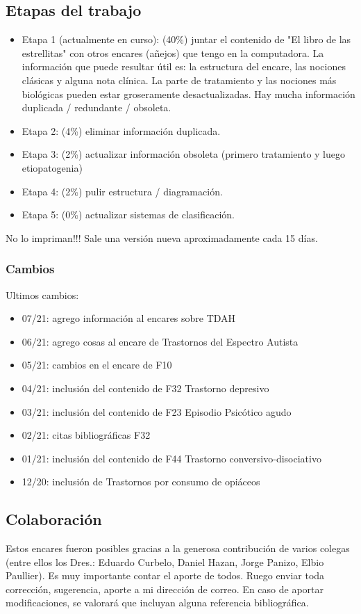 \documentclass[encares.tex]{subfiles}
\begin{document}
\subsection*{Etapas del trabajo}
\begin{itemize}
\item Etapa 1 (actualmente en curso): \faBatteryHalf (40\%) juntar el contenido de "El libro de las estrellitas" con otros encares (añejos) que tengo en la computadora. La información que puede resultar útil es: la estructura del encare, las nociones clásicas y alguna nota clínica. La parte de tratamiento y las nociones más biológicas pueden estar groseramente desactualizadas. Hay mucha información duplicada / redundante / obsoleta.
\item Etapa 2: \faBatteryEmpty (4\%) eliminar información duplicada.
\item Etapa 3: \faBatteryEmpty (2\%) actualizar información obsoleta (primero tratamiento y luego etiopatogenia)
\item Etapa 4: \faBatteryEmpty (2\%) pulir estructura / diagramación.
\item Etapa 5: \faBatteryEmpty (0\%) actualizar sistemas de clasificación.
\end{itemize}
\faStop No lo impriman!!! Sale una versión nueva aproximadamente cada 15 días.
\subsubsection*{Cambios}
Ultimos cambios:
\begin{itemize}
\item 07/21: agrego información al encares sobre TDAH
\item 06/21: agrego cosas al encare de Trastornos del Espectro Autista
\item 05/21: cambios en el encare de F10
\item 04/21: inclusión del contenido de F32 Trastorno depresivo
\item 03/21: inclusión del contenido de F23 Episodio Psicótico agudo
\item 02/21: citas bibliográficas F32
\item 01/21: inclusión del contenido de F44 Trastorno conversivo-disociativo
\item 12/20: inclusión de Trastornos por consumo de opiáceos
\end{itemize}
\subsection*{Colaboración}
Estos encares fueron posibles gracias a la generosa contribución de varios colegas (entre ellos los Dres.: Eduardo Curbelo, Daniel Hazan, Jorge Panizo, Elbio Paullier). Es muy importante contar el aporte de todos. Ruego enviar toda corrección, sugerencia, aporte a mi dirección de correo. En caso de aportar modificaciones, se valorará que incluyan alguna referencia bibliográfica.
\end{document}
